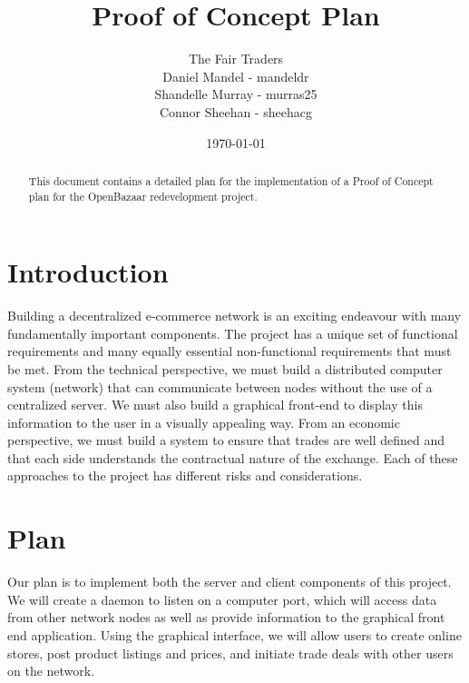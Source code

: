 \documentclass{article}
\begin{document}
\title{Proof of Concept Plan}
\author{The Fair Traders \\ Daniel Mandel - mandeldr \\ Shandelle Murray - murras25 \\ Connor Sheehan - sheehacg}
\date{\today}
\maketitle

\begin{abstract}
This document contains a detailed plan for the implementation of a Proof of Concept plan for the OpenBazaar redevelopment project.
\end{abstract}

\section{Introduction}
Building a decentralized e-commerce network is an exciting endeavour with many fundamentally important components. The project has a unique set of functional requirements and many equally essential non-functional requirements that must be met. From the technical perspective, we must build a distributed computer system (network) that can communicate between nodes without the use of a centralized server. We must also build a graphical front-end to display this information to the user in a visually appealing way. From an economic perspective, we must build a system to ensure that trades are well defined and that each side understands the contractual nature of the exchange. Each of these approaches to the project has different risks and considerations. 

\section{Plan}
Our plan is to implement both the server and client components of this project. We will create a daemon to listen on a computer port, which will access data from other network nodes as well as provide information to the graphical front end application. Using the graphical interface, we will allow users to create online stores, post product listings and prices, and initiate trade deals with other users on the network. 
\end{document}
